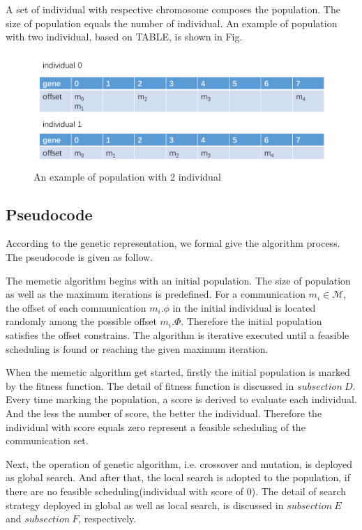 \documentclass[jornal]{IEEEtran}
\begin{document}
A set of individual with respective chromosome composes the population. The size of population equals the number of individual. An example of population with two individual, based on TABLE, is shown in Fig.

\begin{figure}[!t]
	\centering
	\includegraphics[width=3 in]{picture/2individual}
	\caption{An example of population with 2 individual}
	\label{f:indi}
\end{figure}

\subsection{Pseudocode}

According to the genetic representation, we formal give the algorithm process. The pseudocode is given as follow.

The memetic algorithm begins with an initial population. The size of population as well as the maximum iterations is predefined. For a communication $m_{i}\in\mathcal{M}$, the offset of each communication $m_{i}.\phi$ in the initial individual is located randomly among the possible offset $m_{i}.\Phi$. Therefore the initial population satisfies the offset constrains. The algorithm is iterative executed until a feasible scheduling is found or reaching the given maximum iteration.

When the memetic algorithm get started, firstly the initial population is marked by the fitness function. The detail of fitness function is discussed in $subsection\ D$. Every time marking the population, a score is derived to evaluate each individual. And the less the number of score, the better the individual. Therefore the individual with score equals zero represent a feasible scheduling of the communication set.

Next, the operation of genetic algorithm, i.e. crossover and mutation, is deployed as global search. And after that, the local search is adopted to the population, if there are no feasible scheduling(individual with score of 0). The detail of search strategy deployed in global as well as local search, is discussed in $subsection\ E$ and $subsection\ F$, respectively.
\end{document}
